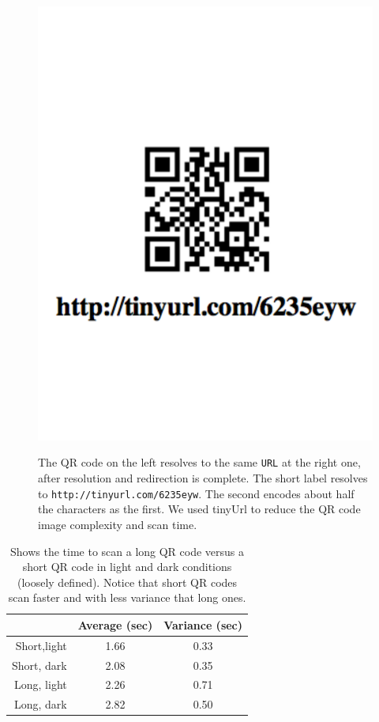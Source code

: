 \begin{figure}[htb!]
\begin{center}
{            \includegraphics[scale=0.35]{figs/qrcex}
        }
\end{center}
\caption{
	The QR code on the left resolves to the same {\tt URL} at the right one, after resolution and
	redirection is complete. 
	The short label resolves to {\tt http://tinyurl.com/6235eyw}.  The second encodes about half
	the characters as the first.
	We used tinyUrl to reduce the QR code image complexity and scan time.
     }%
\label{fig:qrcexcomp}
\end{figure}

\begin{table}
\label{tab:qrscans}
\begin{center}
  \begin{tabular}{| r | c  c | }
    \hline
    			 & {\bf Average (sec) } & {\bf Variance (sec)} \\ \hline
    Short,light & 1.66 & 0.33 \\ \hline
    Short, dark & 2.08 & 0.35 \\ \hline
    Long, light & 2.26 & 0.71 \\ \hline
    Long, dark & 2.82 & 0.50 \\
    \hline
  \end{tabular}
\caption{Shows the time to scan a long QR code versus a short QR code in light and dark conditions (loosely defined).
Notice that short QR codes scan faster and with less variance that long ones.}
\end{center}

\end{table}

